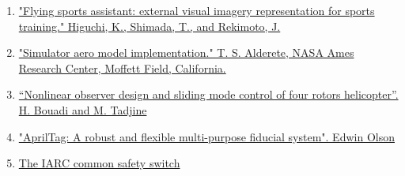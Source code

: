 \documentclass[12pt]{article}
\begin{document}
\begin{enumerate}
    \item \href{https://www.researchgate.net/publication/220947254_Flying_sports_assistant_External_visual_imagery_representation_for_sports_training}{"Flying sports assistant: external visual imagery representation for sports training." Higuchi, K., Shimada, T., and Rekimoto, J.}
    \item \href{http://www.aviationsystemsdivision.arc.nasa.gov/publications/hitl/rtsim/Toms.pdf}{"Simulator aero model implementation." T. S. Alderete, NASA Ames Research Center, Moffett Field, California.}
    \item \href{https://www.researchgate.net/publication/228962656_Nonlinear_observer_design_and_sliding_mode_control_of_four_rotor_helicopter}{“Nonlinear observer design and sliding mode control of four rotors helicopter”. H. Bouadi and M. Tadjine} 
    \item \href{https://april.eecs.umich.edu/papers/details.php?name=olson2010tags}{"AprilTag: A robust and flexible multi-purpose fiducial system". Edwin Olson}
    \item \href{http://www.aerialroboticscompetition.org/downloads/killswitch.zip}{The IARC common safety switch}
\end{enumerate}
\end{document}
